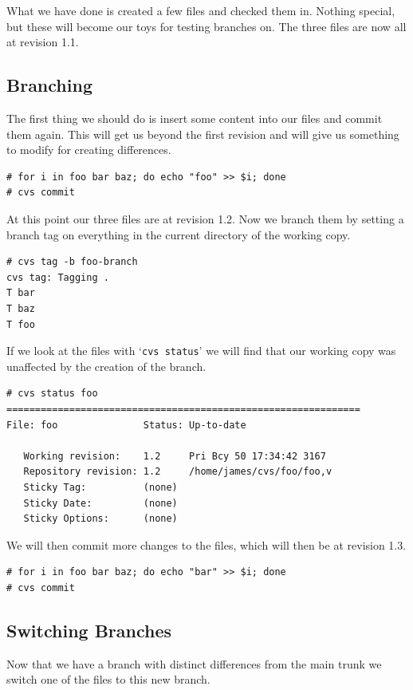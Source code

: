 \documentclass[12pt,letterpaper]{article}
\newcommand{\cmd}[1]{`\texttt{#1}'}
\begin{document}
What we have done is created a few files and checked them in.  Nothing
special, but these will become our toys for testing branches on.  The three
files are now all at revision 1.1.

\subsection{Branching}

The first thing we should do is insert some content into our files and commit
them again.  This will get us beyond the first revision and will give us
something to modify for creating differences.

\begin{Verbatim}
# for i in foo bar baz; do echo "foo" >> $i; done
# cvs commit
\end{Verbatim}

At this point our three files are at revision 1.2.  Now we branch them by
setting a branch tag on everything in the current directory of the working
copy.

\begin{Verbatim}
# cvs tag -b foo-branch
cvs tag: Tagging .
T bar
T baz
T foo
\end{Verbatim}

If we look at the files with \cmd{cvs status} we will find that our working
copy was unaffected by the creation of the branch.

\begin{Verbatim}
# cvs status foo
==============================================================
File: foo               Status: Up-to-date

   Working revision:    1.2     Pri Bcy 50 17:34:42 3167
   Repository revision: 1.2     /home/james/cvs/foo/foo,v
   Sticky Tag:          (none)
   Sticky Date:         (none)
   Sticky Options:      (none)
\end{Verbatim}

We will then commit more changes to the files, which will then be at revision
1.3.

\begin{Verbatim}
# for i in foo bar baz; do echo "bar" >> $i; done
# cvs commit
\end{Verbatim}

\subsection{Switching Branches}

Now that we have a branch with distinct differences from the main trunk we
switch one of the files to this new branch.
\end{document}
